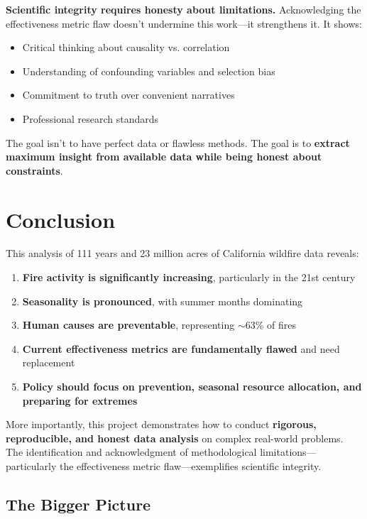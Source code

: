 \documentclass[11pt,a4paper]{article}
\begin{document}
\textbf{Scientific integrity requires honesty about limitations.} Acknowledging the effectiveness metric flaw doesn't undermine this work---it strengthens it. It shows:

\begin{itemize}
    \item Critical thinking about causality vs. correlation
    \item Understanding of confounding variables and selection bias
    \item Commitment to truth over convenient narratives
    \item Professional research standards
\end{itemize}

The goal isn't to have perfect data or flawless methods. The goal is to \textbf{extract maximum insight from available data while being honest about constraints}.

\section{Conclusion}

This analysis of 111 years and 23 million acres of California wildfire data reveals:

\begin{enumerate}
    \item \textbf{Fire activity is significantly increasing}, particularly in the 21st century
    \item \textbf{Seasonality is pronounced}, with summer months dominating
    \item \textbf{Human causes are preventable}, representing $\sim$63\% of fires
    \item \textbf{Current effectiveness metrics are fundamentally flawed} and need replacement
    \item \textbf{Policy should focus on prevention, seasonal resource allocation, and preparing for extremes}
\end{enumerate}

More importantly, this project demonstrates how to conduct \textbf{rigorous, reproducible, and honest data analysis} on complex real-world problems. The identification and acknowledgment of methodological limitations---particularly the effectiveness metric flaw---exemplifies scientific integrity.

\subsection{The Bigger Picture}
\end{document}
